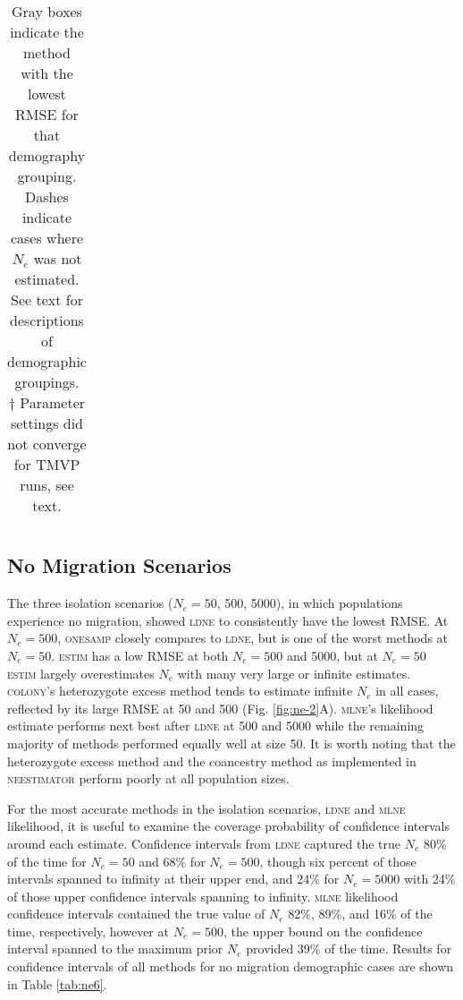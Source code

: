 \begin{table}[]
\begin{tabular}{llllllllllll}
\end{tabular}
\caption*{\small{Gray boxes indicate the method with the lowest RMSE for that demography grouping. 
Dashes indicate cases where $N_e$ was not estimated. See text for descriptions of 
demographic groupings.} \\
\footnotesize{$\dagger$ Parameter settings did not converge for \textsc{TMVP} runs, see text.}}
\label{tab:ne-2}
\end{table}

\subsection{No Migration Scenarios}
The three isolation scenarios ($N_e = 50$, 500, 5000), in which populations experience 
no migration, showed \textsc{ldne} to consistently have the lowest RMSE. At $N_e = 500$, \textsc{onesamp} closely compares to 
\textsc{ldne}, but is one of the worst methods at $N_e = 50$. \textsc{estim} has a low RMSE 
at both $N_e = 500$ and 5000, but at $N_e = 50$ \textsc{estim} largely overestimates 
$N_e$ with many very large or infinite estimates. \textsc{colony}'s heterozygote 
excess method tends to estimate infinite $N_e$ in all cases, reflected by its 
large RMSE at 50 and 500 (Fig. \ref{fig:ne-2}A). \textsc{mlne}'s likelihood estimate performs next best 
after \textsc{ldne} at 500 and 5000 while the remaining majority of methods performed equally 
well at size 50. It is worth noting that the heterozygote excess method \citep{Pudovkin:1996} 
and the coancestry method \citep{Nomura:2008} as implemented in \textsc{neestimator} perform poorly at all population sizes.

For the most accurate methods in the isolation scenarios, \textsc{ldne} and \textsc{mlne} 
likelihood, it is useful to examine the coverage probability of confidence intervals around 
each estimate. Confidence intervals from \textsc{ldne} captured the true $N_e$ 80\% 
of the time for $N_e = 50$ and 68\% for $N_e = 500$, though six percent of 
those intervals spanned to infinity at their upper end, and 24\% for $N_e = 5000$ with 
24\% of those upper confidence intervals spanning to infinity. \textsc{mlne} likelihood confidence 
intervals contained the true value of $N_e$ 82\%, 89\%, and 16\% of the time, respectively, 
however at $N_e = 500$, the upper bound on the confidence interval spanned to the maximum 
prior $N_e$ provided 39\% of the time. Results for confidence intervals of all methods 
for no migration demographic cases are shown in Table \ref{tab:ne6}.

